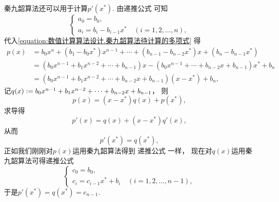 秦九韶算法还可以用于计算\(p'(x^*)\).
由递推公式  可知\begin{equation*}
	\begin{cases}
		a_0 = b_0, \\
		a_i = b_i - b_{i-1} x^*
		\quad(i=1,2,\dotsc,n),
	\end{cases}
\end{equation*}
代入\cref{equation:数值计算算法设计.秦九韶算法待计算的多项式} 得\begin{align*}
	p(x)
	&= b_0 x^n + (b_1 - b_0 x^*) x^{n-1} + \dotsb + (b_{n-1} - b_{n-2} x^*) x + (b_n - b_{n-1} x^*) \\
	&= (b_0 x^{n-1} + b_1 x^{n-2} + \dotsb + b_{n-1}) x
		- (b_0 x^{n-1} + \dotsb + b_{n-2} x + b_{n-1}) x^*
		+ b_n \\
	&= (b_0 x^{n-1} + b_1 x^{n-2} + \dotsb + b_{n-2} x + b_{n-1}) (x - x^*) + b_n,
\end{align*}
记\(q(x) := b_0 x^{n-1} + b_1 x^{n-2} + \dotsb + b_{n-2} x + b_{n-1}\)，
则\begin{equation*}
	p(x) = (x - x^*) q(x) + p(x^*),
\end{equation*}
求导得\begin{equation*}
	p'(x) = q(x) + (x - x^*) q'(x),
\end{equation*}
从而\begin{equation*}
	p'(x^*) = q(x^*),
\end{equation*}
正如我们刚刚对\(p(x)\)运用秦九韶算法得到
递推公式  一样，
现在对\(q(x)\)运用秦九韶算法可得递推公式\begin{equation*}
	\begin{cases}
		c_0 = b_0, \\
		c_i = c_{i-1} x^* + b_i
		\quad(i=1,2,\dotsc,n-1),
	\end{cases}
\end{equation*}
于是\(p'(x^*) = q(x^*) = c_{n-1}\).
